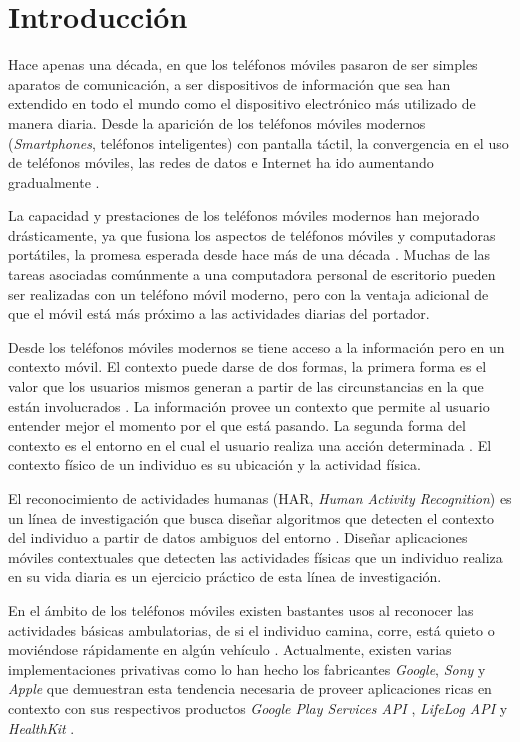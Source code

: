 
\chapter{Introducción}

\label{introduccion}

Hace apenas una década, en que los teléfonos móviles pasaron de ser
simples aparatos de comunicación, a ser dispositivos de información
que sea han extendido en todo el mundo como el dispositivo electrónico
más utilizado de manera diaria. Desde la aparición de los teléfonos
móviles modernos (\emph{Smartphones}, teléfonos inteligentes) con
pantalla táctil, la convergencia en el uso de teléfonos móviles, las
redes de datos e Internet ha ido aumentando gradualmente \cite{fling2009mobile}.

La capacidad y prestaciones de los teléfonos móviles modernos han
mejorado drásticamente, ya que fusiona los aspectos de teléfonos móviles
y computadoras portátiles, la promesa esperada desde hace más de una
década \cite{Tanenbaum2010}. Muchas de las tareas asociadas comúnmente
a una computadora personal de escritorio pueden ser realizadas con
un teléfono móvil moderno, pero con la ventaja adicional de que el
móvil está más próximo a las actividades diarias del portador.

Desde los teléfonos móviles modernos se tiene acceso a la información
pero en un contexto móvil. El contexto puede darse de dos formas,
la primera forma es el valor que los usuarios mismos generan a partir
de las circunstancias en la que están involucrados \cite{fling2009mobile}.
La información provee un contexto que permite al usuario entender
mejor el momento por el que está pasando. La segunda forma del contexto
es el entorno en el cual el usuario realiza una acción determinada
\cite{fling2009mobile}. El contexto físico de un individuo es su
ubicación y la actividad física. 

El reconocimiento de actividades humanas (HAR,
\emph{Human Activity Recognition}) es un línea de investigación que
busca diseñar algoritmos que detecten el contexto del individuo a
partir de datos ambiguos del entorno \cite{Bao2004}. Diseñar aplicaciones
móviles contextuales que detecten las actividades físicas que un individuo
realiza en su vida diaria es un ejercicio práctico de esta línea de
investigación. 

En el ámbito de los teléfonos móviles existen bastantes usos al reconocer
las actividades básicas ambulatorias, de si el individuo camina, corre,
está quieto o moviéndose rápidamente en algún vehículo \cite{campuzano2015}
\cite{googlio2013}. Actualmente, existen varias implementaciones
privativas como lo han hecho los fabricantes \emph{Google}, \emph{Sony}
y \emph{Apple} que demuestran esta tendencia necesaria de proveer
aplicaciones ricas en contexto con sus respectivos productos \emph{Google
Play Services API} \cite{googl2016loc}, \emph{LifeLog API} \cite{sony2016act}
y \emph{HealthKit} \cite{healthkit2016}. 

